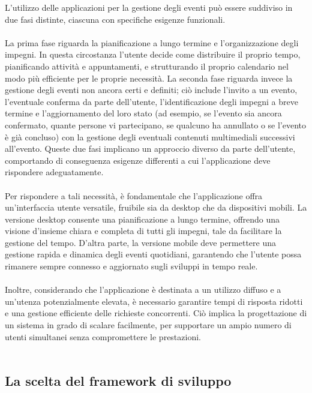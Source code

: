 L’utilizzo delle applicazioni per la gestione degli eventi può essere suddiviso in due fasi distinte, 
ciascuna con specifiche esigenze funzionali.\\
\\
La prima fase riguarda la pianificazione a lungo termine e l’organizzazione degli impegni.
In questa circostanza l’utente decide come distribuire il proprio tempo, pianificando attività e appuntamenti,
e strutturando il proprio calendario nel modo più efficiente per le proprie necessità.
La seconda fase riguarda invece la gestione degli eventi non ancora certi e definiti;
ciò include l’invito a un evento, l’eventuale conferma da parte dell’utente,
l’identificazione degli impegni a breve termine e l’aggiornamento del loro stato
(ad esempio, se l’evento sia ancora confermato, quante persone vi partecipano, se qualcuno ha annullato o se l'evento è già concluso)
con la gestione degli eventuali contenuti multimediali successivi all’evento. 
Queste due fasi implicano un approccio diverso da parte dell’utente,
comportando di conseguenza esigenze differenti a cui l’applicazione deve rispondere adeguatamente.\\
\\
Per rispondere a tali necessità, è fondamentale che l'applicazione offra un'interfaccia utente versatile, 
fruibile sia da desktop che da dispositivi mobili.
La versione desktop consente una pianificazione a lungo termine, offrendo una visione d'insieme chiara e completa di tutti gli impegni,
tale da facilitare la gestione del tempo.
D'altra parte, la versione mobile deve permettere una gestione rapida e dinamica degli eventi quotidiani,
garantendo che l'utente possa rimanere sempre connesso e aggiornato sugli sviluppi in tempo reale.\\
\\
Inoltre, considerando che l'applicazione è destinata a un utilizzo diffuso e a un'utenza potenzialmente elevata,
è necessario garantire tempi di risposta ridotti e una gestione efficiente delle richieste concorrenti.
Ciò implica la progettazione di un sistema in grado di scalare facilmente,
per supportare un ampio numero di utenti simultanei senza compromettere le prestazioni.\\
\\

\subsection{La scelta del framework di sviluppo}

